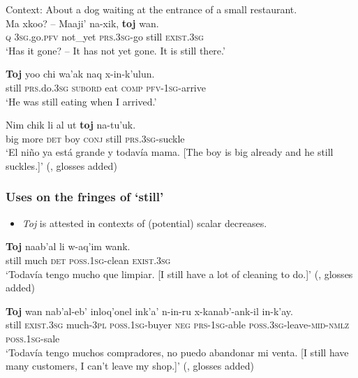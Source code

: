 \begin{exe}
	\ex Context: About a dog waiting at the entrance of a small restaurant.\\
	\gll Ma xkoo? – Maaji' na-xik, \textbf{toj} wan.\\
	\textsc{q} 3\textsc{sg}.go.\textsc{pfv} {} not\_yet \textsc{prs}.3\textsc{sg}-go still \textsc{exist}.3\textsc{sg}\\
	\glt \lq Has it gone? -- It has not yet gone. It is still there.\rq{ }\parencite[450]{Kockelman2020}
	
	\ex
	\gll \textbf{Toj} yoo chi wa'ak naq x-in-k'ulun.\\
	still \textsc{prs}.do.3\textsc{sg} \textsc{subord} eat \textsc{comp} \textsc{pfv}-1\textsc{sg}-arrive\\
	\glt \lq He was still eating when I arrived.'   \parencite[461]{Kockelman2020}
	
	\ex\label{exAppendixKekchi4}
	\gll Nim chik li al ut \textbf{toj} na-tu’uk.\\
	big more \textsc{det} boy \textsc{conj} still \textsc{prs}.3\textsc{sg}-suckle\\
	\glt \lq El niño ya está grande y todavía mama. [The boy is big already and he still suckles.]' (\cite[172]{VocabularioKechi2004}, glosses added)
\end{exe}

\subsubsection{Uses on the fringes of \lq{}still\rq{}}\label{appendixKekchiScalar}
\begin{itemize}
	\item \textit{Toj} is attested in contexts of (potential) scalar decreases.
\end{itemize}

\begin{exe}

	\ex
	\gll \textbf{Toj} naab’al li w-aq’im wank.\\
	still much \textsc{det} \textsc{poss}.1\textsc{sg}-clean \textsc{exist}.3\textsc{sg}\\
	\glt \lq Todavía tengo mucho que limpiar. [I still have a lot of cleaning to do.]\rq{ }(\cite[30]{VocabularioKechi2004}, glosses added) 
	
	\ex 
	\gll \textbf{Toj} wan nab'al-eb' inloq'onel ink'a' n-in-ru x-kanab'-ank-il in-k'ay.\\
	still \textsc{exist}.3\textsc{sg} much-3\textsc{pl} \textsc{poss}.1\textsc{sg}-buyer \textsc{neg} \textsc{prs}-1\textsc{sg}-able \textsc{poss}.3\textsc{sg}-leave-\textsc{mid}-\textsc{nmlz} \textsc{poss}.1\textsc{sg}-sale\\
	\glt \lq Todavía tengo muchos compradores, no puedo abandonar mi venta. [I still have many customers, I can't leave my shop.]\rq{ }(\cite[196]{SamJuarezEtAl2003}, glosses added)

\end{exe}

